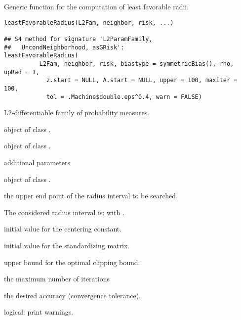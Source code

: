 \begin{Description}\relax
Generic function for the computation of least favorable radii.
\end{Description}
\begin{Usage}
\begin{verbatim}
leastFavorableRadius(L2Fam, neighbor, risk, ...)

## S4 method for signature 'L2ParamFamily,
##   UncondNeighborhood, asGRisk':
leastFavorableRadius(
          L2Fam, neighbor, risk, biastype = symmetricBias(), rho, upRad = 1, 
            z.start = NULL, A.start = NULL, upper = 100, maxiter = 100, 
            tol = .Machine$double.eps^0.4, warn = FALSE)
\end{verbatim}
\end{Usage}
\begin{Arguments}
\begin{ldescription}
\item[\code{L2Fam}] L2-differentiable family of probability measures. 
\item[\code{neighbor}] object of class . 
\item[\code{risk}] object of class . 
\item[\code{...}] additional parameters 
\item[\code{biastype}] object of class . 
\item[\code{upRad}] the upper end point of the radius interval to be searched. 
\item[\code{rho}] The considered radius interval is: 
with . 
\item[\code{z.start}] initial value for the centering constant. 
\item[\code{A.start}] initial value for the standardizing matrix. 
\item[\code{upper}] upper bound for the optimal clipping bound. 
\item[\code{maxiter}] the maximum number of iterations 
\item[\code{tol}] the desired accuracy (convergence tolerance).
\item[\code{warn}] logical: print warnings. 
\end{ldescription}
\end{Arguments}

